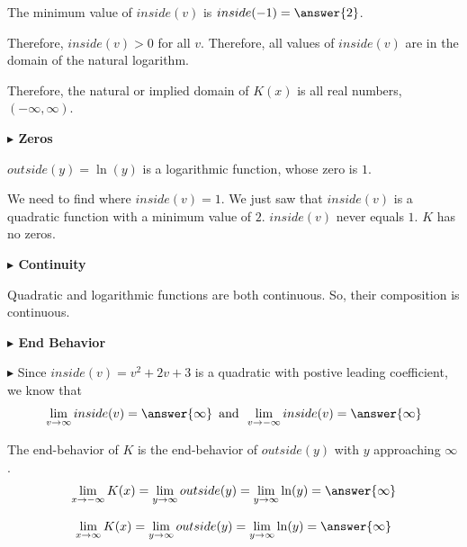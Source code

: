 \documentclass{ximera}
\begin{document}
The minimum value of $inside(v)$ is $inside(-1) = \answer{2}$.  

Therefore, $inside(v) > 0$ for all $v$. Therefore, all values of $inside(v)$ are in the domain of the natural logarithm. 

Therefore, the natural or implied domain of $K(x)$ is all real numbers, $(-\infty, \infty)$. 









\textbf{\textcolor{blue!55!black}{$\blacktriangleright$ Zeros}} 


$outside(y) = \ln(y)$ is a logarithmic function, whose zero is $1$. 

We need to find where $inside(v) = 1$. We just saw that $inside(v)$ is a quadratic function with a minimum value of $2$.  $inside(v)$ never equals $1$.  $K$ has no zeros. 






\textbf{\textcolor{blue!55!black}{$\blacktriangleright$ Continuity}} 


Quadratic and logarithmic functions are both continuous. So, their composition is continuous. 




\textbf{\textcolor{blue!55!black}{$\blacktriangleright$ End Behavior}} 






$\blacktriangleright$ Since $inside(v) = v^2 + 2v + 3$ is a quadratic with postive leading coefficient, we know that 
\[  \lim\limits_{v \to \infty}inside(v) = \answer{\infty}  \, \text{ and } \,  \lim\limits_{v \to -\infty}inside(v) = \answer{\infty}  \]


The end-behavior of $K$ is the end-behavior of $outside(y)$ with $y$ approaching $\infty $. \\



\[  
\lim\limits_{x \to -\infty}K(x) =  \lim\limits_{y \to \infty}outside(y) =   \lim\limits_{y \to \infty}\ln(y) =  \answer{\infty}
\]





\[  
\lim\limits_{x \to \infty}K(x) =  \lim\limits_{y \to \infty}outside(y) =   \lim\limits_{y \to \infty}\ln(y) =  \answer{\infty}
\]
\end{document}
